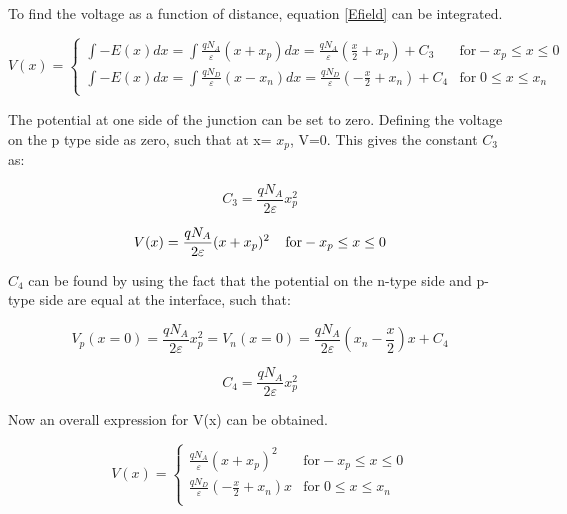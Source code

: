 \begin{doublespace}
To find the voltage as a function of distance, equation \ref{Efield} can be integrated.

\begin{equation}
V(x) = \begin{cases}
       \int -E(x)dx=\int \frac{qN_{A}}{\varepsilon}(x+x_{p}) dx = \frac{qN_{A}}{\varepsilon}(\frac{x}{2}+x_{p})+ C_{3} & \text{for}  -x_{p}\leq x \leq 0 \\
       \int -E(x)dx=\int \frac{qN_{D}}{\varepsilon}(x-x_{n}) dx = \frac{qN_{D}}{\varepsilon}(-\frac{x}{2}+x_{n})+ C_{4}  &  \text{for} \; 0 \leq x \leq x_{n}  \\
     \end{cases}
\end{equation}

The potential at one side of the junction can be set to zero. Defining the voltage on the p type side as zero, such that at x= $x_p$, V=0. This gives the constant $C_3$ as:


\begin{equation}
C_{3}=\frac{qN_{A}}{2\varepsilon}x_{p}^{2}
\end{equation}

\begin{equation}
V(x)=\frac{qN_{A}}{2\varepsilon}(x+x_{p})^{2}  \; \; \;\;  \text{for}  -x_{p}\leq x \leq 0 \\
\end{equation}

$C_4$ can be found by using the fact that the potential on the n-type side and p-type side are equal at the interface, such that:

\begin{equation}
V_{p}(x=0)=\frac{qN_{A}}{2\varepsilon}x_{p}^2=V_{n}(x=0)=\frac{qN_{A}}{2\varepsilon}(x_{n}-\frac{x}{2})x+C_{4}
\end{equation}

\begin{equation}
C_{4}=\frac{qN_{A}}{2\varepsilon}x_{p}^2
\end{equation}

Now an overall expression for V(x) can be obtained.

\begin{equation}
V(x) = \begin{cases}
       \frac{qN_{A}}{\varepsilon}(x+x_{p})^2 & \text{for}  -x_{p}\leq x \leq 0 \\
       \frac{qN_{D}}{\varepsilon}(-\frac{x}{2}+x_{n})x  &  \text{for} \; 0 \leq x \leq x_{n}  \\
     \end{cases}
\end{equation}


\end{doublespace}
